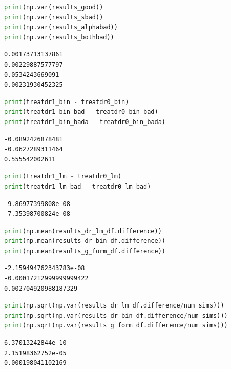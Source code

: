 \begin{lstlisting}[language=Python]
print(np.var(results_good))
print(np.var(results_sbad))
print(np.var(results_alphabad))
print(np.var(results_bothbad))
\end{lstlisting}

\begin{lstlisting}
0.00173713137861
0.00229887577797
0.0534243669091
0.00231930452325
\end{lstlisting}

\begin{lstlisting}[language=Python]
print(treatdr1_bin - treatdr0_bin)
print(treatdr1_bin_bad - treatdr0_bin_bad)
print(treatdr1_bin_bada - treatdr0_bin_bada)
\end{lstlisting}

\begin{lstlisting}
-0.0892426878481
-0.0627289311464
0.555542002611
\end{lstlisting}

\begin{lstlisting}[language=Python]
print(treatdr1_lm - treatdr0_lm)
print(treatdr1_lm_bad - treatdr0_lm_bad)
\end{lstlisting}

\begin{lstlisting}
-9.86977399808e-08
-7.35398700824e-08
\end{lstlisting}

\begin{lstlisting}[language=Python]
print(np.mean(results_dr_lm_df.difference))
print(np.mean(results_dr_bin_df.difference))
print(np.mean(results_g_form_df.difference))
\end{lstlisting}

\begin{lstlisting}
-2.159494762343783e-08
-0.00017212999999999422
0.002704920988187329
\end{lstlisting}

\begin{lstlisting}[language=Python]
print(np.sqrt(np.var(results_dr_lm_df.difference/num_sims)))
print(np.sqrt(np.var(results_dr_bin_df.difference/num_sims)))
print(np.sqrt(np.var(results_g_form_df.difference/num_sims)))
\end{lstlisting}

\begin{lstlisting}
6.37013242844e-10
2.15198362752e-05
0.000198041102169
\end{lstlisting}

